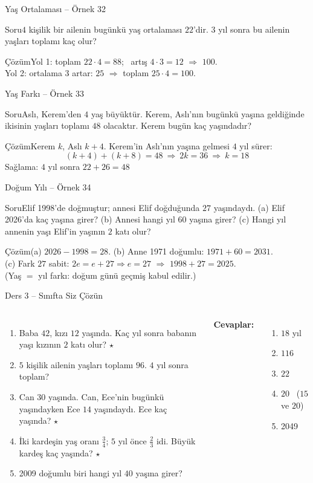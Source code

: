 \documentclass[aspectratio=169,11pt]{beamer}
\newcommand{\soru}[3]{%
\begin{frame}{#1}
  \begin{block}{Soru}\large #2\end{block}
  \pause
  \begin{exampleblock}{Çözüm}\large #3\end{exampleblock}
\end{frame}}
\begin{document}
\soru{Yaş Ortalaması -- Örnek 32}
{\(4\) kişilik bir ailenin bugünkü yaş ortalaması \(22\)'dir. \(3\) yıl sonra bu ailenin yaşları toplamı kaç olur?}
{Yol 1: toplam \(22\cdot 4=88\); \ artış \(4\cdot 3=12\) \(\Rightarrow\) \(100\).\\[4pt]
Yol 2: ortalama \(3\) artar: \(25\) \(\Rightarrow\) toplam \(25\cdot 4=100\).}

\soru{Yaş Farkı -- Örnek 33}
{Aslı, Kerem'den \(4\) yaş büyüktür. Kerem, Aslı'nın bugünkü yaşına geldiğinde ikisinin yaşları toplamı \(48\) olacaktır. Kerem bugün kaç yaşındadır?}
{Kerem \(k\), Aslı \(k+4\). Kerem'in Aslı'nın yaşına gelmesi \(4\) yıl sürer:
\[(k+4)+(k+8)=48\ \Rightarrow\ 2k=36\ \Rightarrow\ k=18\]
Sağlama: \(4\) yıl sonra \(22+26=48\) \checkmark}

\soru{Doğum Yılı -- Örnek 34}
{Elif 1998'de doğmuştur; annesi Elif doğduğunda \(27\) yaşındaydı. (a) Elif 2026'da kaç yaşına girer? (b) Annesi hangi yıl \(60\) yaşına girer? (c) Hangi yıl annenin yaşı Elif'in yaşının \(2\) katı olur?}
{(a) \(2026-1998=28\). \quad (b) Anne 1971 doğumlu: \(1971+60=2031\).\\[3pt]
(c) Fark \(27\) sabit: \(2e=e+27\Rightarrow e=27\) \(\Rightarrow\) \(1998+27=2025\).\\[3pt]
{\normalsize (Yaş \(=\) yıl farkı: doğum günü geçmiş kabul edilir.)}}

\begin{frame}{Ders 3 -- Sınıfta Siz Çözün}
\begin{columns}[t]
\begin{enumerate}
\item Baba \(42\), kızı \(12\) yaşında. Kaç yıl sonra babanın yaşı kızının \(2\) katı olur? \(\star\)
\item \(5\) kişilik ailenin yaşları toplamı \(96\). \(4\) yıl sonra toplam?
\item Can \(30\) yaşında. Can, Ece'nin bugünkü yaşındayken Ece \(14\) yaşındaydı. Ece kaç yaşında? \(\star\)
\item İki kardeşin yaş oranı \(\frac{3}{4}\); \(5\) yıl önce \(\frac{2}{3}\) idi. Büyük kardeş kaç yaşında? \(\star\)
\item 2009 doğumlu biri hangi yıl \(40\) yaşına girer?
\end{enumerate}
\pause
\textbf{Cevaplar:}
\begin{enumerate}
\item \(18\) yıl
\item \(116\)
\item \(22\)
\item \(20\) \ (\(15\) ve \(20\))
\item 2049
\end{enumerate}
\end{columns}
\vspace{4pt}{\footnotesize \(\star\) işaretli soruların adım adım çözümü sonraki slaytlardadır.}
\end{frame}
\end{document}
